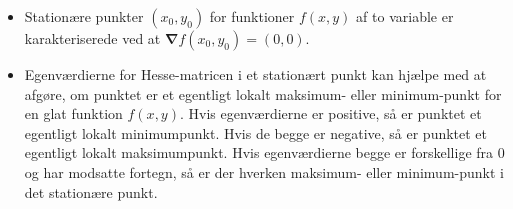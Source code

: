 \begin{summary}
\begin{itemize}
\begin{equation}
\begin{aligned}
\begin{array}{c}
                                                                                   \end{array}
                                                                                 \right]\\
&\phantom{abcdefghij}+\rho^{2}_{(x_{0}, y_{0})}(x,y)\cdot \varepsilon_{f}(x-x_{0}, y-y_{0}) \quad .
\end{aligned}
\end{equation}
\item Stationære punkter $(x_{0}, y_{0})$ for funktioner $f(x,y)$ af to variable er karakteriserede ved at $\bm{\nabla}f(x_{0}, y_{0}) = (0,0)$.
\item Egenværdierne for Hesse-matricen i et stationært punkt kan hjælpe med at afgøre, om punktet er et egentligt lokalt maksimum- eller minimum-punkt for en glat funktion $f(x,y)$. Hvis egenværdierne er positive, så er punktet et egentligt lokalt minimumpunkt. Hvis de begge er negative, så er punktet et egentligt lokalt maksimumpunkt. Hvis egenværdierne begge er forskellige fra $0$ og har modsatte fortegn, så er der hverken maksimum- eller minimum-punkt i det stationære punkt.
\end{itemize}
\end{summary}






